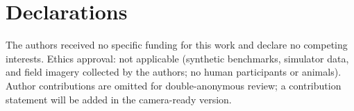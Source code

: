 \documentclass[11pt,a4paper]{article}
\begin{document}
\section*{Declarations}

The authors received no specific funding for this work and declare no
competing interests. Ethics approval: not applicable (synthetic benchmarks,
simulator data, and field imagery collected by the authors; no human
participants or animals). Author
contributions are omitted for double-anonymous review; a contribution
statement will be added in the camera-ready version.

{\footnotesize


}
\end{document}
